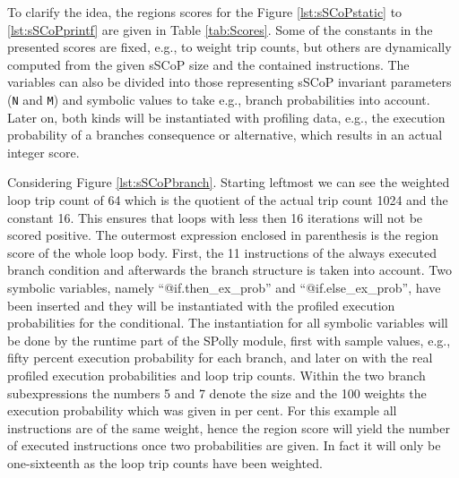 To clarify the idea, the regions scores for the Figure \ref{lst:sSCoPstatic}
to \ref{lst:sSCoPprintf} are given in Table \ref{tab:Scores}. 
Some of the constants in the presented scores are fixed, e.g., to 
weight trip counts, but others are dynamically 
computed from the given sSCoP size and the contained instructions. The variables
can also be divided into those representing sSCoP invariant parameters 
(\texttt{N} and \texttt{M}) and symbolic values to take 
e.g., branch probabilities into account. 
Later on, both kinds will be instantiated with profiling data, e.g., the 
execution probability of a branches consequence or alternative,
which results in an actual integer score. 

Considering Figure \ref{lst:sSCoPbranch}. Starting leftmost we can
see the weighted loop trip count of 64 which is the quotient of the actual trip
count 1024 and the constant 16. This ensures that loops with less then 16 iterations will not 
be scored positive.
The outermost expression enclosed in parenthesis 
is the region score of the whole loop body. First, the 11 instructions of the always 
executed branch condition and afterwards the branch structure is taken into account.
Two symbolic variables, namely  ``@if.then\_ex\_prob'' and ``@if.else\_ex\_prob'',
have been inserted and they will be instantiated with the 
profiled execution probabilities for the conditional. The instantiation for all 
symbolic variables will be done by the runtime part of the SPolly module,
first with sample values, e.g., fifty percent execution probability for each branch,
and later on with the real profiled execution probabilities and loop trip counts. 
Within the two branch subexpressions the numbers 5 and 7 
denote the size and the 100 weights
the execution probability which was given in per cent. For this example all
instructions are of the same weight, hence the region score will yield the number
of executed instructions once two probabilities are given. 
In fact it will only be one-sixteenth as the loop trip counts have been weighted. \\

